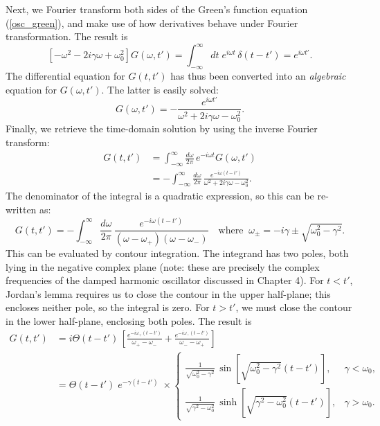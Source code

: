 \documentclass[10pt,a4paper]{article}
\begin{document}
Next, we Fourier transform both sides of the Green's function equation
(\ref{osc_green}), and make use of how derivatives behave under
Fourier transformation. The result is
\begin{equation}
  \left[- \omega^2 - 2i \gamma\omega + \omega_0^2\right] G(\omega,t')
  = \int_{-\infty}^\infty dt \; e^{i\omega t}\, \delta(t-t') = e^{i\omega t'}.
\end{equation}
The differential equation for $G(t,t')$ has thus been converted into
an \emph{algebraic} equation for $G(\omega,t')$. The latter is easily
solved:
\begin{equation}
  G(\omega, t') = - \frac{e^{i\omega t'}}{\omega^2 + 2i\gamma\omega - \omega_0^2}.
\end{equation}
Finally, we retrieve the time-domain solution by using the inverse
Fourier transform:
\begin{align}
  G(t,t') &= \int_{-\infty}^\infty \frac{d\omega}{2\pi} \,
  e^{-i\omega t} G(\omega, t')  \\&= - \int_{-\infty}^\infty \frac{d\omega}{2\pi}
  \, \frac{e^{-i\omega (t-t')}}{\omega^2 + 2i\gamma\omega - \omega_0^2}.
\end{align}
The denominator of the integral is a quadratic expression, so this can
be re-written as:
\begin{equation}
  G(t,t') = - \int_{-\infty}^\infty \frac{d\omega}{2\pi} \,
  \frac{e^{-i\omega (t-t')}}{(\omega - \omega_+)(\omega - \omega_-)}
  \quad\mathrm{where}\;\; \omega_{\pm} = -i\gamma \pm
  \sqrt{\omega_0^2-\gamma^2}.
\end{equation}
This can be evaluated by contour integration. The integrand has two
poles, both lying in the negative complex plane (note: these are
precisely the complex frequencies of the damped harmonic oscillator
discussed in Chapter 4). For $t < t'$, Jordan's lemma requires us to
close the contour in the upper half-plane; this encloses neither pole,
so the integral is zero. For $t > t'$, we must close the contour in
the lower half-plane, enclosing both poles. The result is
\begin{align}
  G(t,t') &= i \Theta(t-t') \,
  \left[ \frac{e^{-i\omega_+ (t-t')}}{\omega_+ - \omega_-}
    + \frac{e^{-i\omega_- (t-t')}}{\omega_- - \omega_+}\right] \\
  &= \Theta(t-t') \;e^{-\gamma(t-t')} \; \times
  \left\{\begin{array}{ll} \frac{1}{\sqrt{\omega_0^2-\gamma^2}}\,
  \sin\left[\sqrt{\omega_0^2-\gamma^2} (t-t')\right],
  & \gamma < \omega_0, \\
  \frac{1}{\sqrt{\gamma^2-\omega_0^2}}\,
  \sinh\left[\sqrt{\gamma^2-\omega_0^2} (t-t')\right],
  & \gamma > \omega_0.\end{array}\right.
\end{align}
\end{document}
